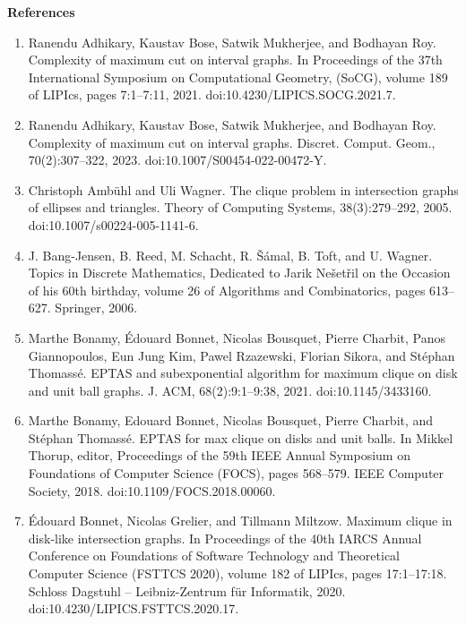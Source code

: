 \par
\par
\par
\par\medskip\noindent\textbf{References}\par
\begin{enumerate}
\item[]  [1]  Ranendu Adhikary, Kaustav Bose, Satwik Mukherjee, and Bodhayan Roy.  Complexity of maximum cut on interval graphs.  In Proceedings of the 37th International Symposium on Computational Geometry, (SoCG), volume 189 of LIPIcs, pages 7:1–7:11, 2021.  doi:10.4230/LIPICS.SOCG.2021.7.  
\item[]  [2]  Ranendu Adhikary, Kaustav Bose, Satwik Mukherjee, and Bodhayan Roy.  Complexity of maximum cut on interval graphs.  Discret. Comput. Geom., 70(2):307–322, 2023.  doi:10.1007/S00454-022-00472-Y.  
\item[]  [3]  Christoph Ambühl and Uli Wagner.  The clique problem in intersection graphs of ellipses and triangles.  Theory of Computing Systems, 38(3):279–292, 2005.  doi:10.1007/s00224-005-1141-6.  
\item[]  [4]  J. Bang-Jensen, B. Reed, M. Schacht, R. Šámal, B. Toft, and U. Wagner.  Topics in Discrete Mathematics, Dedicated to Jarik Nešetřil on the Occasion of his 60th birthday, volume 26 of Algorithms and Combinatorics, pages 613–627.  Springer, 2006.  
\item[]  [5]  Marthe Bonamy, Édouard Bonnet, Nicolas Bousquet, Pierre Charbit, Panos Giannopoulos, Eun Jung Kim, Pawel Rzazewski, Florian Sikora, and Stéphan Thomassé.  EPTAS and subexponential algorithm for maximum clique on disk and unit ball graphs.  J. ACM, 68(2):9:1–9:38, 2021.  doi:10.1145/3433160.  
\item[]  [6]  Marthe Bonamy, Edouard Bonnet, Nicolas Bousquet, Pierre Charbit, and Stéphan Thomassé.  EPTAS for max clique on disks and unit balls.  In Mikkel Thorup, editor, Proceedings of the 59th IEEE Annual Symposium on Foundations of Computer Science (FOCS), pages 568–579. IEEE Computer Society, 2018.  doi:10.1109/FOCS.2018.00060.  
\item[]  [7]  Édouard Bonnet, Nicolas Grelier, and Tillmann Miltzow.  Maximum clique in disk-like intersection graphs.  In Proceedings of the 40th IARCS Annual Conference on Foundations of Software Technology and Theoretical Computer Science (FSTTCS 2020), volume 182 of LIPIcs, pages 17:1–17:18. Schloss Dagstuhl – Leibniz-Zentrum für Informatik, 2020.  doi:10.4230/LIPICS.FSTTCS.2020.17.  

\end{enumerate}
